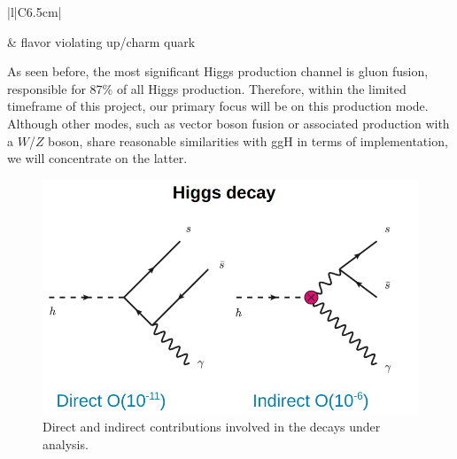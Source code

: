 \begin{table}[!ht]
\begin{tabular}[t]{|l|C{6.5cm}|}
 & \vspace*{-2.47cm} flavor violating up/charm quark \\[-8pt]\hline
    \end{tabular}
    \caption{Higgs rare decays of the form H$\protect\decaysto M\gamma$, where $M$ is a vector containing light quarks.}
    \label{tab:Higgs_rare_decays}
\end{table}

As seen before, the most significant Higgs production channel is gluon fusion, responsible for 87\% of all Higgs production. Therefore, within the limited timeframe of this project, our primary focus will be on this production mode. Although other modes, such as vector boson fusion or associated production with a $W$/$Z$ boson, share reasonable similarities with ggH in terms of implementation, we will concentrate on the latter.


\begin{figure}[!ht]
    \vspace*{-0.0cm}
    \centering
    \setlength{\mylength}{\textwidth}
    \includegraphics[width=0.60\mylength]{resources/vertices.png}
    \vspace*{-0.0cm}
    \caption{Direct and indirect contributions involved in the decays under analysis.}
    \label{fig:veritces}
    \vspace*{-0.0cm}
\end{figure}

